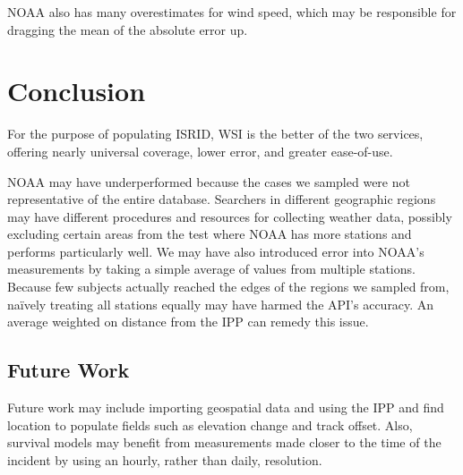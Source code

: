 \documentclass[12pt]{article}
\begin{document}
    

    NOAA also has many overestimates for wind speed, which may be responsible
    for dragging the mean of the absolute error up.

  \section{Conclusion}
    For the purpose of populating ISRID, WSI is the better of the two services,
    offering nearly universal coverage, lower error, and greater ease-of-use.

    NOAA may have underperformed because the cases we sampled were not
    representative of the entire database. Searchers in different geographic
    regions may have different procedures and resources for collecting weather
    data, possibly excluding certain areas from the test where NOAA has more
    stations and performs particularly well. We may have also introduced error
    into NOAA's measurements by taking a simple average of values from multiple
    stations. Because few subjects actually reached the edges of the regions we
    sampled from, na\"{i}vely treating all stations equally may have harmed
    the API's accuracy. An average weighted on distance from the IPP can remedy
    this issue.

    \subsection{Future Work}
      Future work may include importing geospatial data and using the IPP and
      find location to populate fields such as elevation change and track
      offset. Also, survival models may benefit from measurements made closer
      to the time of the incident by using an hourly, rather than daily,
      resolution.

  
  
\end{document}
